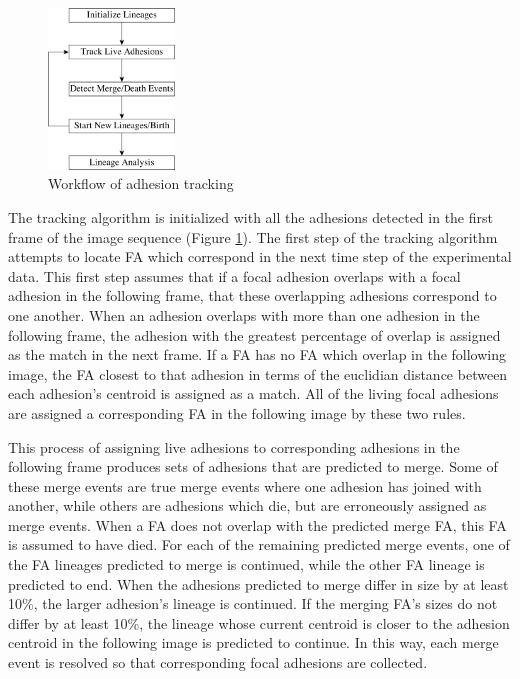 \documentclass[letterpaper,twocolumn]{article}
\begin{document}
\begin{figure}[htbp]
\begin{center}
\includegraphics[width=0.3\textwidth]{figures/tracking_chart}
\caption{Workflow of adhesion tracking}
\label{tracking_chart}
\end{center}
\end{figure}

The tracking algorithm is initialized with all the adhesions detected in the first frame of the image sequence (Figure \ref{tracking_chart}). The first step of the tracking algorithm attempts to locate FA which correspond in the next time step of the experimental data. This first step assumes that if a focal adhesion overlaps with a focal adhesion in the following frame, that these overlapping adhesions correspond to one another. When an adhesion overlaps with more than one adhesion in the following frame, the adhesion with the greatest percentage of overlap is assigned as the match in the next frame. %
If a FA has no FA which overlap in the following image, the FA closest to that adhesion in terms of the euclidian distance between each adhesion's centroid is assigned as a match. All of the living focal adhesions are assigned a corresponding FA in the following image by these two rules.

This process of assigning live adhesions to corresponding adhesions in the following frame produces sets of adhesions that are predicted to merge. Some of these merge events are true merge events where one adhesion has joined with another, while others are adhesions which die, but are erroneously assigned as merge events. When a FA does not overlap with the predicted merge FA, this FA is assumed to have died. For each of the remaining predicted merge events, one of the FA lineages predicted to merge is continued, while the other FA lineage is predicted to end. When the adhesions predicted to merge differ in size by at least 10\%, the larger adhesion's lineage is continued. If the merging FA's sizes do not differ by at least 10\%, the lineage whose current centroid is closer to the adhesion centroid in the following image is predicted to continue. In this way, each merge event is resolved so that corresponding focal adhesions are collected.
\end{document}

